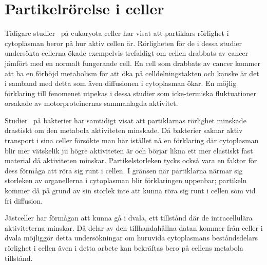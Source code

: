 \chapter{Partikelrörelse i celler}



Tidigare studier~\cite{Gou_etal2014} på eukaryota celler har visat att
partiklars rörlighet i cytoplasman beror på hur aktiv cellen
är. Rörligheten för de i dessa studier undersökta cellerna ökade exempelvis
trefaldigt om cellen drabbats av cancer jämfört med en normalt
fungerande cell. En cell som drabbats av cancer kommer att ha en
förhöjd metabolism för att öka på celldelningstakten och kanske är det i samband med detta som även diffusionen i cytoplasman ökar. En möjlig förklaring till fenomenet utpekas i dessa studier som icke-termiska fluktuationer orsakade av motorproteinernas sammanlagda aktivitet.

Studier~\cite{Parry_etal2014} på bakterier har samtidigt visat att
partiklarnas rörlighet minskade drastiskt om den metabola aktiviteten
minskade. Då bakterier saknar aktiv transport i sina celler försökte man här istället nå en förklaring där cytoplasman blir mer vätskelik ju högre aktiviteten är och börjar
likna ett mer elastiskt fast material då aktiviteten
minskar. Partikelstorleken tycks också vara en faktor för dess förmåga
att röra sig runt i cellen. I gränsen när partiklarna närmar sig
storleken av organellerna i cytoplasman blir förklaringen uppenbar;
partikeln kommer då på grund av sin storlek inte att kunna röra sig
runt i cellen som vid fri diffusion. 

Jästceller har förmågan att kunna gå i dvala, ett tillstånd där de
intracellulära aktiviteterna minskar. Då delar av den tillhandahållna
datan kommer från celler i dvala möjliggör detta undersökningar om
huruvida cytoplasmans beståndsdelars rörlighet i cellen även i detta arbete kan bekräftas bero på
cellens metabola tillstånd. 


